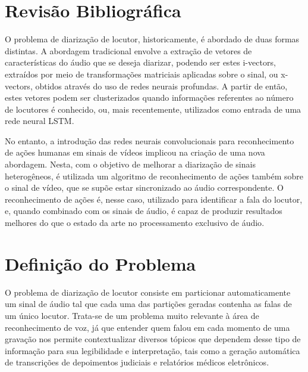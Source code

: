 \section{Revisão Bibliográfica}
\label{sec:related-work}

O problema de diarização de locutor, historicamente, é abordado de duas formas distintas. A abordagem tradicional envolve a extração de vetores de características do áudio que se deseja diarizar, podendo ser estes i-vectors\cite{dehakFrontEndFactorAnalysis2011}, extraídos por meio de transformações matriciais aplicadas sobre o sinal, ou x-vectors\cite{snyderXVectorsRobustDNN2018}, obtidos através do uso de redes neurais profundas. A partir de então, estes vetores podem ser clusterizados\cite{sellSpeakerDiarizationPlda2014} quando informações referentes ao número de locutores é conhecido, ou, mais recentemente, utilizados como entrada de uma rede neural LSTM\cite{wangSpeakerDiarizationLSTM2018}.

No entanto, a introdução das redes neurais convolucionais para reconhecimento de ações humanas em sinais de vídeos\cite{ji3DConvolutionalNeural2013, karpathyLargeScaleVideoClassification2014} implicou na criação de uma nova abordagem. Nesta, com o objetivo de melhorar a diarização de sinais heterogêneos, é utilizada um algoritmo de reconhecimento de ações também sobre o sinal de vídeo\cite{hersheyAudiovisualGraphicalModels2004}, que se supõe estar sincronizado ao áudio correspondente. O reconhecimento de ações é, nesse caso, utilizado para identificar a fala do locutor, e, quando combinado com os sinais de áudio, é capaz de produzir resultados melhores do que o estado da arte no processamento exclusivo de áudio\cite{ephratLookingListenCocktail2018}.

\section{Definição do Problema}
\label{sec:problem-desc}

O problema de diarização de locutor consiste em particionar automaticamente um sinal de áudio tal que cada uma das partições geradas contenha as falas de um único locutor. Trata-se de um problema muito relevante à área de reconhecimento de voz, já que entender quem falou em cada momento de uma gravação nos permite contextualizar diversos tópicos que dependem desse tipo de informação para sua legibilidade e interpretação, tais como a geração automática de transcrições de depoimentos judiciais e relatórios médicos eletrônicos.

